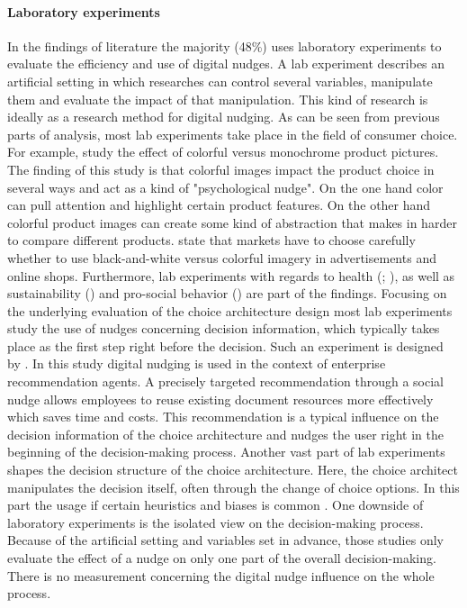 \paragraph{Laboratory experiments}
In the findings of literature the majority (48\%) uses laboratory experiments to evaluate the efficiency and use of digital nudges. A lab experiment describes an artificial setting in which researches can control several variables, manipulate them and evaluate the impact of that manipulation. This kind of research is ideally as a research method for digital nudging. As can be seen from previous parts of analysis, most lab experiments take place in the field of consumer choice. For example, \cite{lee_monochrome_2014} study the effect of colorful versus monochrome product pictures. The finding of this study is that colorful images impact the product choice in several ways and act as a kind of "psychological nudge". On the one hand color can pull attention and highlight certain product features. On the other hand colorful product images can create some kind of abstraction that makes in harder to compare different products. \cite{lee_monochrome_2014} state that markets have to choose carefully whether to use black-and-white versus colorful imagery in advertisements and online shops.
Furthermore, lab experiments with regards to health (\cite{laran_nonconscious_2018}; \cite{langley_should_2015}), as well as sustainability (\cite{bruns_can_2018}) and pro-social behavior (\cite{zarghamee_nudging_2017}) are part of the findings. Focusing on the underlying evaluation of the choice architecture design most lab experiments study the use of nudges concerning decision information, which typically takes place as the first step right before the decision. Such an experiment is designed by \cite{kretzer_designing_2018}. In this study digital nudging is used in the context of enterprise recommendation agents. A precisely targeted recommendation through a social nudge allows employees to reuse existing document resources more effectively which saves time and costs. This recommendation is a typical influence on the decision information of the choice architecture and nudges the user right in the beginning of the decision-making process. 
Another vast part of lab experiments shapes the decision structure of the choice architecture. Here, the choice architect manipulates the decision itself, often through the change of choice options. In this part the usage if certain heuristics and biases is common \cite{tversky_judgment_1974}.
One downside of laboratory experiments is the isolated view on the decision-making process. Because of the artificial setting and variables set in advance, those studies only evaluate the effect of a nudge on only one part of the overall decision-making. There is no measurement concerning the digital nudge influence on the whole process.
 
